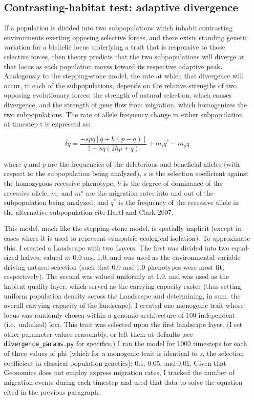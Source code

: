 ﻿\documentclass{article}
\begin{document}
\subsection{Contrasting-habitat test: adaptive divergence}
If a population is divided into two subpopulations which inhabit contrasting
environments exerting opposing selective forces, and there exists standing genetic
variation for a biallelic locus underlying a trait that is responsive to those
selective forces, then theory predicts that the two subpopulations will diverge at
that locus as each population moves toward its respective adaptive peak. Analogously
to the stepping-stone model, the rate at which that divergence will occur,
in each of the subpopulations, depends on the relative strengths
of two opposing evolutionary forces: the strength of natural selection,
which causes divergence, and the strength of gene flow from migration,
which homogenizes the two subpopulations. The rate of allele frequency change
in either subpopulation at timestep t is expressed as:

\begin{equation}
\delta{q} = \frac{-spq[q + h(p - q)]}{1 - sq(2hp + q)} + m_{i}q^{*} - m_{o}q
\end{equation}

where $q$ and $p$ are the frequencies of the deleterious and beneficial
alleles (with respect to the subpopulation being analyzed), $s$ is the selection
coefficient against the homozygous recessive phenotype, $h$ is the degree of dominance
of the recessive allele, $m_{i}$ and $m^{o}$ are the migration rates into and out of
the subpopulation being analyzed, and $q^{*}$ is the frequency of the recessive allele
in the alternative subpopulation {\large cite Hartl and Clark 2007}.

This model, much like the stepping-stone model, is spatially implicit
(except in cases where it is used to represent sympatric ecological isolation).
To approximate this, I created a Landscape with two Layers. The first
was divided into two equal-sized halves, valued at 0.0 and 1.0, and was used
as the environmental variable driving natural selection (such that 0.0 and 1.0
phenotypes were most fit, respectively). The second was valued uniformly at 1.0,
and was used as the habitat-quality layer, which served as the carrying-capacity
raster (thus setting uniform population density across the Landscape and determining,
in sum, the overall carrying capacity of the landscape).
I created one monogenic trait whose locus was randomly chosen within a 
genomic architecture of 100 independent (i.e.\ unlinked) loci. This trait was selected
upon the first landscape layer.  (I set other parameter values reasonably, or left them
at defaults ;see \texttt{divergence\_params.py} for specifics.) I ran the model for 1000
timesteps for each of three values of phi (which for a monogenic trait is
identical to \emph{s}, the selection coefficient in classical population genetics): 
0.1, 0.05, and 0.01. Given that Geonomics does not employ express migration rates,
I tracked the number of migration events during each timestep and used that
data to solve the equation cited in the previous paragraph.
\end{document}
